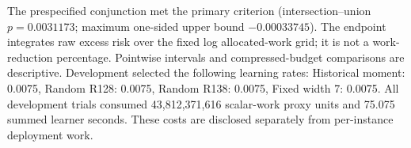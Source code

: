The prespecified conjunction met the primary criterion (intersection--union $p=0.0031173$; maximum one-sided upper bound $-0.00033745$). The endpoint integrates raw excess risk over the fixed log allocated-work grid; it is not a work-reduction percentage. Pointwise intervals and compressed-budget comparisons are descriptive.
Development selected the following learning rates: Historical moment: 0.0075, Random R128: 0.0075, Random R138: 0.0075, Fixed width 7: 0.0075. All development trials consumed 43,812,371,616 scalar-work proxy units and 75.075 summed learner seconds. These costs are disclosed separately from per-instance deployment work.
